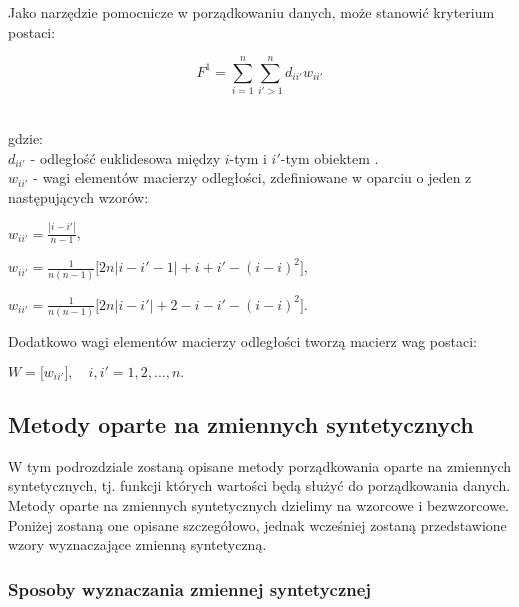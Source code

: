 \documentclass[12pt,a4paper]{report}
\begin{document}
Jako narzędzie pomocnicze w porządkowaniu danych, może stanowić kryterium postaci:

\begin{center}
$$F^1= \sum_{i=1}^{n} \sum_{i'>1}^{n} d_{ii'}w_{ii'}$$\\
\end{center}
gdzie:\\
 $d_{ii'}$ - odległość euklidesowa między $i$-tym i $i'$-tym obiektem . \\
 $w_{ii'}$ - wagi elementów macierzy odległości, zdefiniowane w oparciu o jeden z następujących wzorów: \\
 
 \begin{center}
 
 $ w_{ii'}=\frac{| i-i' |}{n-1}$, $\qquad$ \\
   \end{center}
   \begin{center}
 $ w_{ii'}=\frac{1}{n(n-1)}\lbrack{2n|i-i'-1|+i+i'-(i-i)^2\rbrack}$,\\
 \end{center}
 \begin{center}
 $ w_{ii'}=\frac{1}{n(n-1)}\lbrack{2n|i-i'|+2-i-i'-(i-i)^2\rbrack}$.\\
\end{center}

Dodatkowo wagi elementów macierzy odległości tworzą macierz wag postaci:

\begin{center}
$W=\lbrack{w_{ii'}\rbrack},\quad i,i'=1, 2, ..., n.$
\end{center}



\newpage
\subsection{Metody oparte na zmiennych syntetycznych}

W tym podrozdziale zostaną opisane metody porządkowania oparte na zmiennych syntetycznych, tj. funkcji których wartości będą służyć do porządkowania danych. Metody oparte na zmiennych syntetycznych dzielimy na wzorcowe i bezwzorcowe. Poniżej zostaną one opisane szczegółowo, jednak wcześniej zostaną przedstawione wzory wyznaczające zmienną syntetyczną. \\

\subsubsection{Sposoby wyznaczania zmiennej syntetycznej}
\end{document}
